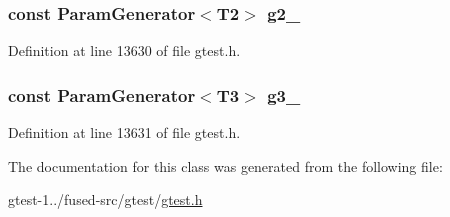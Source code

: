 \hypertarget{classtesting_1_1internal_1_1CartesianProductGenerator3_a4bd40d1fbb8c6d2895b5201e62afbe38}{
\subsubsection[{g2\-\_\-}]{\setlength{\rightskip}{0pt plus 5cm}const {\bf \-Param\-Generator}$<$\-T2$>$ {\bf g2\-\_\-}}}\label{d1/d15/classtesting_1_1internal_1_1CartesianProductGenerator3_a4bd40d1fbb8c6d2895b5201e62afbe38}


\-Definition at line 13630 of file gtest.\-h.

\hypertarget{classtesting_1_1internal_1_1CartesianProductGenerator3_acda98d4bf8f619856fb2e0ec015b9bc8}{
\subsubsection[{g3\-\_\-}]{\setlength{\rightskip}{0pt plus 5cm}const {\bf \-Param\-Generator}$<$\-T3$>$ {\bf g3\-\_\-}}}\label{d1/d15/classtesting_1_1internal_1_1CartesianProductGenerator3_acda98d4bf8f619856fb2e0ec015b9bc8}


\-Definition at line 13631 of file gtest.\-h.



\-The documentation for this class was generated from the following file\-:\begin{DoxyCompactItemize}
\item 
gtest-\/1../fused-\/src/gtest/\hyperlink{fused-src_2gtest_2gtest_8h}{gtest.\-h}\end{DoxyCompactItemize}
